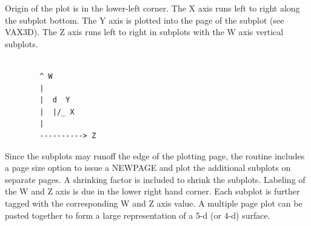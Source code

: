 \documentclass[11pt]{report}
\begin{document}
Origin of the plot is in the lower-left corner.  The X axis runs
left to right along the subplot bottom.  The Y axis is plotted into
the page of the subplot (see VAX3D).
The Z axis runs left to right in subplots
with the W axis vertical subplots.
\begin{verbatim}

        ^ W
        |
        |  d  Y  
        |  |/_ X
        |
        ----------> Z
\end{verbatim}

Since the subplots may runoff the edge of the plotting page, the routine
includes a page size option to issue a NEWPAGE and plot the additional
subplots on separate pages.  A shrinking factor is included to shrink the
subplots.
Labeling of the W and Z axis is due in the lower right hand corner.
Each subplot is further tagged with the corresponding W and Z axis
value.  A multiple page plot can be pasted together to form a large
representation of a 5-d (or 4-d) surface.
\end{document}
